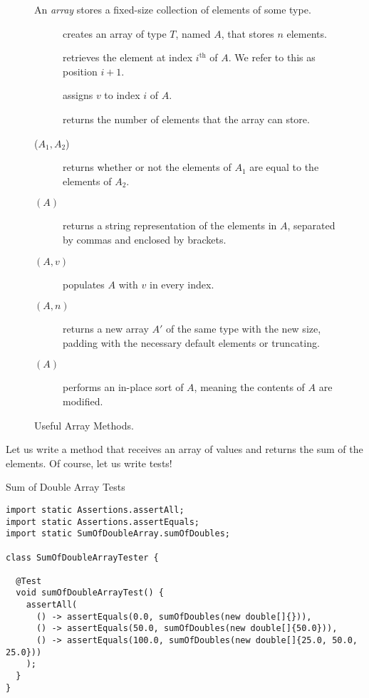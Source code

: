 \begin{figure}[tp]
  \small
  \begin{tcolorbox}[title=Java Arrays]
    An \textit{array} stores a fixed-size collection of elements of some type.
    \vspace{2ex}
  \begin{description}
    \item [] creates an array of type $T$, named $A$, that stores $n$ elements.
    \item [] retrieves the element at index $i^{\text{th}}$ of $A$. We refer to this as position $i + 1$.
    \item [] assigns $v$ to index $i$ of $A$.
    \item [] returns the number of elements that the array can store.
    \item [($A_1, A_2$)] returns whether or not the elements of $A_1$ are equal to the elements of $A_2$.
    \item [$(A)$] returns a string representation of the elements in $A$, separated by commas and enclosed by brackets.
    \item [$(A, v)$] populates $A$ with $v$ in every index.
    \item [$(A, n)$] returns a new array $A'$ of the same type with the new size, padding with the necessary default elements or truncating.
    \item [$(A)$] performs an in-place sort of $A$, meaning the contents of $A$ are modified.
  \end{description}
\end{tcolorbox}
  \caption{Useful Array Methods.}
  \label{fig:arrays}
\end{figure}

\example Let us write a method that receives an array of  values and returns the sum of the elements. Of course, let us write tests!

\begin{cl}{Sum of Double Array Tests}
\begin{lstlisting}[language=MyJava]
import static Assertions.assertAll;
import static Assertions.assertEquals;
import static SumOfDoubleArray.sumOfDoubles;

class SumOfDoubleArrayTester {

  @Test
  void sumOfDoubleArrayTest() {
    assertAll(
      () -> assertEquals(0.0, sumOfDoubles(new double[]{})),
      () -> assertEquals(50.0, sumOfDoubles(new double[]{50.0})),
      () -> assertEquals(100.0, sumOfDoubles(new double[]{25.0, 50.0, 25.0}))
    );
  }
}
\end{lstlisting}
\end{cl}

